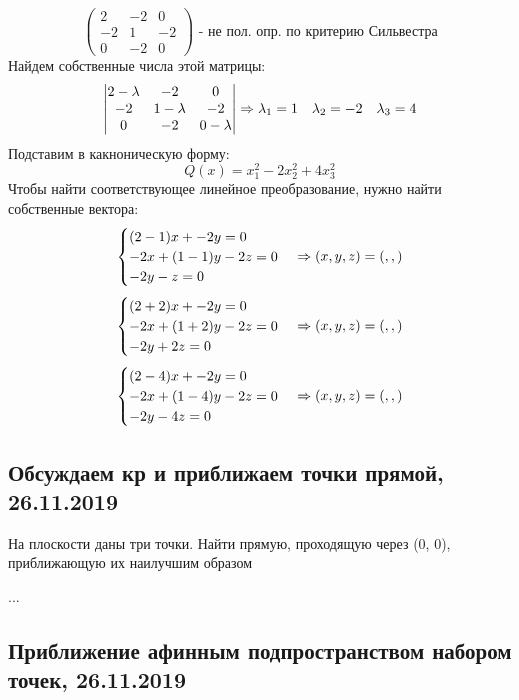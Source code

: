 \documentclass[12pt, fleqn]{article}
\begin{document}
\begin{Sol}
  \[\begin{pmatrix}
    2 & -2 & 0\\
    -2 & 1 & -2\\
    0 & -2 & 0
  \end{pmatrix} \text{ - не пол. опр. по критерию Сильвестра}\]
  Найдем собственные числа этой матрицы:
  \[\begin{vmatrix}
    2 - \lambda & -2 & 0\\
    -2 & 1 - \lambda & -2\\
    0 & -2 & 0 - \lambda
  \end{vmatrix} \Rightarrow \lambda_1 = 1\quad \lambda_2 = -2\quad \lambda_3 = 4\]
  Подставим в какноническую форму:
  \[Q(x) = x_1^2 - 2x_2^2 + 4x_3^2\]
  Чтобы найти соответствующее линейное преобразование, нужно найти собственные вектора:
  \[\begin{cases}
    (2-1)x + -2y = 0\\
    -2x + (1-1)y -2z = 0\\
    -2y -z = 0
  \end{cases} \Rightarrow (x,y,z) = (,,)\]
  \[\begin{cases}
    (2+2)x + -2y = 0\\
    -2x + (1+2)y -2z = 0\\
    -2y +2z = 0
  \end{cases} \Rightarrow (x,y,z) = (,,)\]
  \[\begin{cases}
    (2-4)x + -2y = 0\\
    -2x + (1-4)y -2z = 0\\
    -2y - 4z = 0
  \end{cases} \Rightarrow (x,y,z) = (,,)\]
\end{Sol}

\subsection{Обсуждаем кр и приближаем точки прямой, 26.11.2019}

\begin{task}
    На плоскости даны три точки. Найти прямую, проходящую через (0, 0), приближающую их наилучшим образом
\end{task}

\begin{sol}
    ...
\end{sol}

\subsection{Приближение афинным подпространством набором точек, 26.11.2019}
\end{document}
